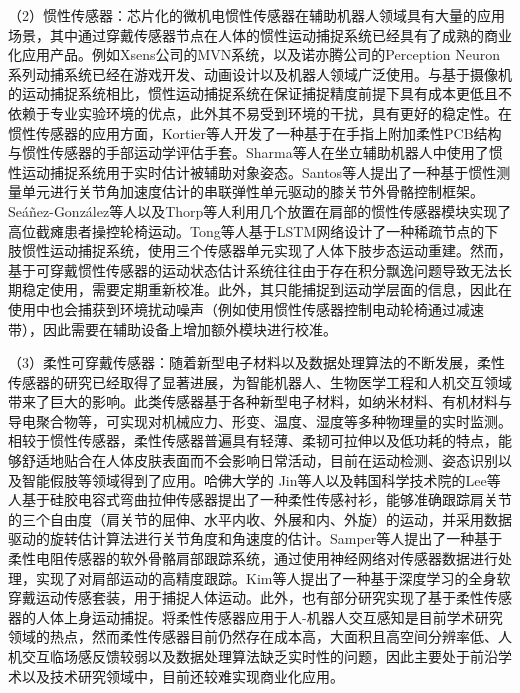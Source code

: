 （2）惯性传感器：芯片化的微机电惯性传感器在辅助机器人领域具有大量的应用场景，其中通过穿戴传感器节点在人体的惯性运动捕捉系统已经具有了成熟的商业化应用产品。例如Xsens公司的MVN系统，以及诺亦腾公司的Perception Neuron系列动捕系统已经在游戏开发、动画设计以及机器人领域广泛使用。与基于摄像机的运动捕捉系统相比，惯性运动捕捉系统在保证捕捉精度前提下具有成本更低且不依赖于专业实验环境的优点，此外其不易受到环境的干扰，具有更好的稳定性。在惯性传感器的应用方面，Kortier等人\cite{kortierAssessmentHandKinematics2014}开发了一种基于在手指上附加柔性PCB结构与惯性传感器的手部运动学评估手套。Sharma等人\cite{sharmaBiomechanicalTrajectoryOptimization2022,sharmaPhysicalHumanRobotInteraction2022}在坐立辅助机器人中使用了惯性运动捕捉系统用于实时估计被辅助对象姿态。Santos等人\cite{dossantosIMUbasedTransparencyControl2022}提出了一种基于惯性测量单元进行关节角加速度估计的串联弹性单元驱动的膝关节外骨骼控制框架。Seáñez-González等人\cite{seanez-gonzalezStaticDynamicDecoding2017}以及Thorp等人\cite{thorpUpperBodyBasedPower2016d}利用几个放置在肩部的惯性传感器模块实现了高位截瘫患者操控轮椅运动。Tong等人\cite{tongLSTMBasedLowerLimbs2020}基于LSTM网络设计了一种稀疏节点的下肢惯性运动捕捉系统，使用三个传感器单元实现了人体下肢步态运动重建。然而，基于可穿戴惯性传感器的运动状态估计系统往往由于存在积分飘逸问题导致无法长期稳定使用，需要定期重新校准。此外，其只能捕捉到运动学层面的信息，因此在使用中也会捕获到环境扰动噪声（例如使用惯性传感器控制电动轮椅通过减速带），因此需要在辅助设备上增加额外模块进行校准。

（3）柔性可穿戴传感器：随着新型电子材料以及数据处理算法的不断发展，柔性传感器的研究已经取得了显著进展，为智能机器人、生物医学工程和人机交互领域带来了巨大的影响。此类传感器基于各种新型电子材料，如纳米材料、有机材料与导电聚合物等，可实现对机械应力、形变、温度、湿度等多种物理量的实时监测。相较于惯性传感器，柔性传感器普遍具有轻薄、柔韧可拉伸以及低功耗的特点，能够舒适地贴合在人体皮肤表面而不会影响日常活动，目前在运动检测、姿态识别以及智能假肢等领域得到了应用。哈佛大学的 Jin等人\cite{jinSoftSensingShirt2020}以及韩国科学技术院的Lee等人\cite{leePrintableSkinAdhesive2016}基于硅胶电容式弯曲拉伸传感器提出了一种柔性传感衬衫，能够准确跟踪肩关节的三个自由度（肩关节的屈伸、水平内收、外展和内、外旋）的运动，并采用数据驱动的旋转估计算法进行关节角度和角速度的估计。Samper等人\cite{samper-escuderoEfficientMultiaxialShoulderMotion2020}提出了一种基于柔性电阻传感器的软外骨骼肩部跟踪系统，通过使用神经网络对传感器数据进行处理，实现了对肩部运动的高精度跟踪。Kim等人\cite{kimDeepFullBodyMotion2019}提出了一种基于深度学习的全身软穿戴运动传感套装，用于捕捉人体运动。此外，也有部分研究\cite{contreras-gonzalezEfficientUpperLimb2020,ogataEstimatingMovementsHuman2019}实现了基于柔性传感器的人体上身运动捕捉。将柔性传感器应用于人-机器人交互感知是目前学术研究领域的热点，然而柔性传感器目前仍然存在成本高，大面积且高空间分辨率低、人机交互临场感反馈较弱以及数据处理算法缺乏实时性的问题，因此主要处于前沿学术以及技术研究领域中，目前还较难实现商业化应用。

